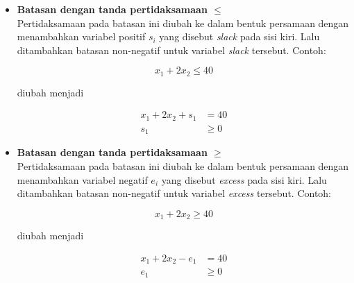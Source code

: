 		\begin{itemize}
			\item \textbf{Batasan dengan tanda pertidaksamaan \(\leq\)}\\
				Pertidaksamaan pada batasan ini diubah ke dalam bentuk persamaan dengan menambahkan variabel positif \(s_i\) yang disebut \textit{slack} pada sisi kiri. Lalu ditambahkan batasan non-negatif untuk variabel \textit{slack} tersebut. Contoh:
				
				\begin{equation*}
					x_1 + 2x_2 \leq 40
				\end{equation*}
				
				diubah menjadi
				
				\begin{equation*}
					\begin{split}
						x_1 + 2x_2 + s_1 &= 40\\
						s_1 &\geq 0
					\end{split}
				\end{equation*}
			
			\item \textbf{Batasan dengan tanda pertidaksamaan \(\geq\)}\\			
				Pertidaksamaan pada batasan ini diubah ke dalam bentuk persamaan dengan menambahkan variabel negatif \(e_i\) yang disebut \textit{excess} pada sisi kiri. Lalu ditambahkan batasan non-negatif untuk variabel \textit{excess} tersebut. Contoh:
				
				\begin{equation*}
					x_1 + 2x_2 \geq 40
				\end{equation*}
				
				diubah menjadi
				
				\begin{equation*}
					\begin{split}
						x_1 + 2x_2 - e_1 &= 40\\
						e_1 &\geq 0
					\end{split}
				\end{equation*}				
		\end{itemize}
		
	
		
